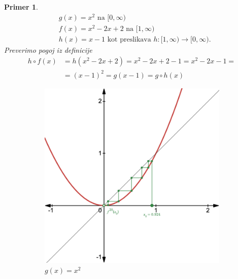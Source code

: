 \documentclass{article}
\newtheorem{primer}{Primer}
\begin{document}
\begin{primer}
\begin{align*}
&g(x) = x^2 \text{ na } [0, \infty) \\ 
&f(x) = x^2 - 2x + 2 \text{ na } [1, \infty) \\ 
&h(x) = x - 1 \text{ kot preslikava } h:[1, \infty) \rightarrow [0, \infty).
\end{align*}
Preverimo pogoj iz definicije 
\begin{align*}
h\circ f(x) &= h(x^2 - 2x + 2) = x^2 -2x + 2 - 1 = x^2 - 2x - 1 = \\ 
&=(x-1)^2 = g(x-1) = g\circ h(x)  
\end{align*}

\begin{center}
    \begin{figure}[h]
        \centering
        \begin{subfigure}{0.45\textwidth}
            \centering
            \includegraphics[width=\textwidth]{Grafi/cobweb11.png}
            \caption{$g(x) = x^2$}
        \end{subfigure}
        \hfill
        \begin{subfigure}{0.45\textwidth}
            \centering

\end{subfigure}
\end{figure}
\end{center}
\end{primer}
\end{document}
